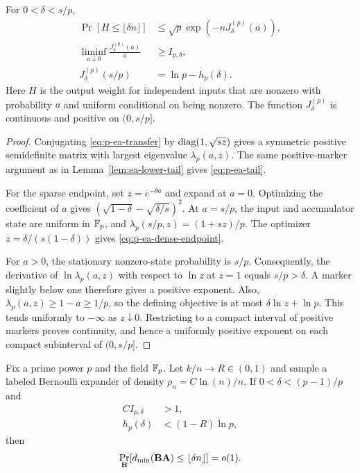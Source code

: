 \begin{lemma}
\label{lem:p-ea-endpoints}
For $0<\delta<s/p$,
\begin{align}
 \Pr[H\leq\lfloor\delta n\rfloor]
 &\leq\sqrt p\exp(-nJ^{(p)}_\delta(a)),
 \label{eq:p-ea-tail}\\
 \liminf_{a\downarrow0}\frac{J^{(p)}_\delta(a)}a
 &\geq I_{p,\delta},
 \label{eq:p-ea-sparse-endpoint}\\
 J^{(p)}_\delta(s/p)&=\ln p-h_p(\delta).
 \label{eq:p-ea-dense-endpoint}
\end{align}
Here $H$ is the output weight for independent inputs that are nonzero with
probability $a$ and uniform conditional on being nonzero.
The function $J^{(p)}_\delta$ is continuous and positive on $(0,s/p]$.
\end{lemma}

\begin{proof}
Conjugating \eqref{eq:p-ea-transfer} by
$\operatorname{diag}(1,\sqrt{sz})$ gives a symmetric positive semidefinite matrix with
largest eigenvalue $\lambda_p(a,z)$.  The same positive-marker argument as in
Lemma~\ref{lem:ea-lower-tail} gives \eqref{eq:p-ea-tail}.

For the sparse endpoint, set $z=e^{-\theta a}$ and expand at $a=0$.
Optimizing the coefficient of $a$ gives
$(\sqrt{1-\delta}-\sqrt{\delta/s})^2$.  At $a=s/p$, the input and accumulator
state are uniform in $\mathbb F_p$, and
$\lambda_p(s/p,z)=(1+sz)/p$.  The optimizer
$z=\delta/(s(1-\delta))$ gives \eqref{eq:p-ea-dense-endpoint}.

For $a>0$, the stationary nonzero-state probability is $s/p$.
Consequently, the derivative of $\ln\lambda_p(a,z)$ with respect to
$\ln z$ at $z=1$ equals $s/p>\delta$.  A marker slightly below one
therefore gives a positive exponent.  Also,
$\lambda_p(a,z)\geq1-a\geq1/p$, so the defining objective is at most
$\delta\ln z+\ln p$.  This tends uniformly to $-\infty$ as $z\downarrow0$.
Restricting to a compact interval of positive markers proves continuity,
and hence a uniformly positive exponent on each compact subinterval of
$(0,s/p]$.
\end{proof}

\begin{theorem}
\label{thm:p-ea-distance}
Fix a prime power $p$ and the field $\mathbb F_p$.  Let $k/n\to R\in(0,1)$ and sample a labeled Bernoulli
expander of density $\rho_n=C\ln(n)/n$.  If
$0<\delta<(p-1)/p$ and
\begin{align}
 C I_{p,\delta}&>1,
 \label{eq:p-ea-sparse-condition}\\
 h_p(\delta)&<(1-R)\ln p,
 \label{eq:p-ea-gv-condition}
\end{align}
then
\begin{equation}
 \Pr_{\mathbf B}[d_{\min}(\mathbf B\mathbf A)\leq\lfloor\delta n\rfloor]=o(1).
 \label{eq:p-ea-distance-conclusion}
\end{equation}
\end{theorem}

